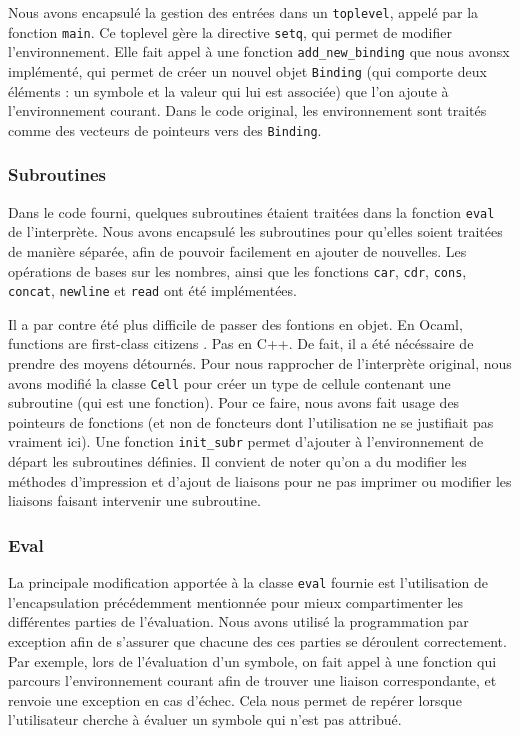 \documentclass[a4paper,11pt]{article}
\begin{document}
  Nous avons encapsulé la gestion des entrées dans un \texttt{toplevel}, 
 appelé par la fonction \texttt{main}. Ce toplevel gère la directive \texttt{setq}, qui
 permet de modifier l'environnement. 
 Elle fait appel à une fonction \texttt{add\_new\_binding} que nous avonsx
 implémenté, qui permet de créer un nouvel objet
  \texttt{Binding} (qui comporte deux éléments : un
 symbole et la valeur qui lui est associée) que l'on ajoute à l'environnement courant. 
 Dans le code original, les environnement sont traités comme des vecteurs de pointeurs 
 vers des
 \texttt{Binding}.

 \subsubsection{Subroutines}
 
  Dans le code fourni, quelques subroutines étaient traitées dans la fonction 
  \texttt{eval} de l'interprète. Nous avons encapsulé les subroutines pour qu'elles soient 
  traitées de manière séparée, afin de pouvoir facilement en ajouter de nouvelles. 
  Les opérations de bases sur les nombres, ainsi que les fonctions \texttt{car}, 
  \texttt{cdr}, \texttt{cons}, \texttt{concat}, \texttt{newline} et \texttt{read} 
  ont été implémentées.

  Il a par contre été plus difficile de passer des fontions en objet. En Ocaml,
  \og functions are first-class citizens \fg. Pas en C++. De fait, il a été
  nécéssaire de prendre des moyens détournés.
  Pour nous rapprocher de l'interprète original, nous avons modifié la classe
  \texttt{Cell} pour créer un type de cellule contenant une subroutine (qui est
  une fonction). Pour ce faire, nous avons fait usage des pointeurs de fonctions
  (et non de foncteurs dont l'utilisation ne se justifiait pas vraiment ici).
  Une fonction \texttt{init\_subr} permet d'ajouter à l'environnement de départ
  les subroutines définies. Il convient de noter qu'on a du modifier les
  méthodes d'impression et d'ajout de liaisons pour ne pas imprimer ou modifier 
  les liaisons faisant
  intervenir une subroutine.
  
 \subsubsection{Eval}
 
 La principale modification apportée à la classe \texttt{eval} fournie est 
l'utilisation de l'encapsulation précédemment mentionnée pour mieux compartimenter 
les différentes parties de l'évaluation. Nous avons utilisé la programmation 
par exception afin de s'assurer que chacune des ces parties se déroulent 
correctement. Par exemple, lors de l'évaluation d'un symbole, on fait appel 
à une fonction qui parcours l'environnement courant afin de trouver une liaison 
correspondante, et renvoie une exception en cas d'échec. Cela nous permet de 
repérer lorsque l'utilisateur cherche à évaluer un symbole qui n'est pas attribué.
\end{document}
